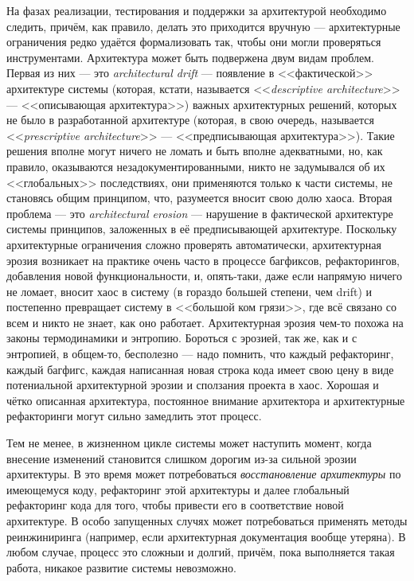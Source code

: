 \documentclass[a5paper]{article}
\begin{document}
На фазах реализации, тестирования и поддержки за архитектурой необходимо следить, причём, как правило, делать это приходится вручную --- архитектурные ограничения редко удаётся формализовать так, чтобы они могли проверяться инструментами. Архитектура может быть подвержена двум видам проблем. Первая из них --- это \emph{architectural drift} --- появление в <<фактической>> архитектуре системы (которая, кстати, называется <<\emph{descriptive architecture}>> --- <<описывающая архитектура>>) важных архитектурных решений, которых не было в разработанной архитектуре (которая, в свою очередь, называется <<\emph{prescriptive architecture}>> --- <<предписывающая архитектура>>). Такие решения вполне могут ничего не ломать и быть вполне адекватными, но, как правило, оказываются незадокументированными, никто не задумывался об их <<глобальных>> последствиях, они применяются только к части системы, не становясь общим принципом, что, разумеется вносит свою долю хаоса. Вторая проблема --- это \emph{architectural erosion} --- нарушение в фактической архитектуре системы принципов, заложенных в её предписывающей архитектуре. Поскольку архитектурные ограничения сложно проверять автоматически, архитектурная эрозия возникает на практике очень часто в процессе багфиксов, рефакторингов, добавления новой функциональности, и, опять-таки, даже если напрямую ничего не ломает, вносит хаос в систему (в гораздо большей степени, чем drift) и постепенно превращает систему в <<большой ком грязи>>, где всё связано со всем и никто не знает, как оно работает. Архитектурная эрозия чем-то похожа на законы термодинамики и энтропию. Бороться с эрозией, так же, как и с энтропией, в общем-то, бесполезно --- надо помнить, что каждый рефакторинг, каждый багфигс, каждая написанная новая строка кода имеет свою цену в виде потениальной архитектурной эрозии и сползания проекта в хаос. Хорошая и чётко описанная архитектура, постоянное внимание архитектора и архитектурные рефакторинги могут сильно замедлить этот процесс.

Тем не менее, в жизненном цикле системы может наступить момент, когда внесение изменений становится слишком дорогим из-за сильной эрозии архитектуры. В это время может потребоваться \emph{восстановление архитектуры} по имеющемуся коду, рефакторинг этой архитектуры и далее глобальный рефакторинг кода для того, чтобы привести его в соответствие новой архитектуре. В особо запущенных случях может потребоваться применять методы реинжиниринга (например, если архитектурная документация вообще утеряна). В любом случае, процесс это сложныи и долгий, причём, пока выполняется такая работа, никакое развитие системы невозможно.
\end{document}
